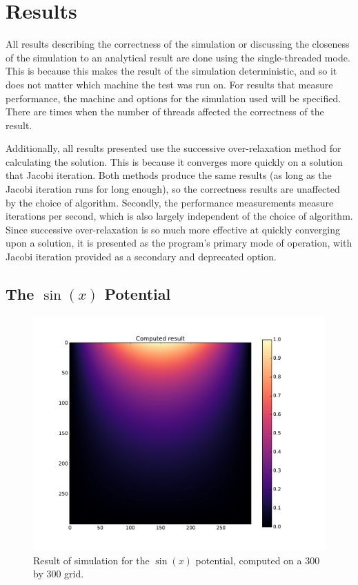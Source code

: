 \section{Results}

All results describing the correctness of the simulation or discussing the closeness of the simulation to an analytical
result are done using the single-threaded mode. This is because this makes the result of the simulation deterministic,
and so it does not matter which machine the test was run on. For results that measure performance, the machine and options
for the simulation used will be specified. There are times when the number of threads affected the correctness of the
result.

Additionally, all results presented use the successive over-relaxation method for calculating the solution. This is because
it converges more quickly on a solution that Jacobi iteration. Both methods produce the same results (as long as the Jacobi
iteration runs for long enough), so the correctness results are unaffected by the choice of algorithm. Secondly, the performance
measurements measure iterations per second, which is also largely independent of the choice of algorithm. Since successive
over-relaxation is so much more effective at quickly converging upon a solution, it is presented as the program's primary
mode of operation, with Jacobi iteration provided as a secondary and deprecated option.

\subsection{The $\sin(x)$ Potential}

	\begin{figure}[h!]
	\centering
	\includegraphics[width=1.1\linewidth]{sin300_calc.pdf}
	\caption{Result of simulation for the $\sin(x)$ potential, computed on a 300 by 300 grid.} 
	\label{fig:sin-result}
	\end{figure}

